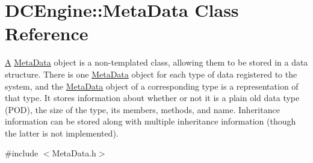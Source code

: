 \hypertarget{classDCEngine_1_1MetaData}{\section{D\-C\-Engine\-:\-:Meta\-Data Class Reference}
\label{classDCEngine_1_1MetaData}
}


\hyperlink{classA}{A} \hyperlink{classDCEngine_1_1MetaData}{Meta\-Data} object is a non-\/templated class, allowing them to be stored in a data structure. There is one \hyperlink{classDCEngine_1_1MetaData}{Meta\-Data} object for each type of data registered to the system, and the \hyperlink{classDCEngine_1_1MetaData}{Meta\-Data} object of a corresponding type is a representation of that type. It stores information about whether or not it is a plain old data type (P\-O\-D), the size of the type, its members, methods, and name. Inheritance information can be stored along with multiple inheritance information (though the latter is not implemented).  




{\ttfamily \#include $<$Meta\-Data.\-h$>$}

